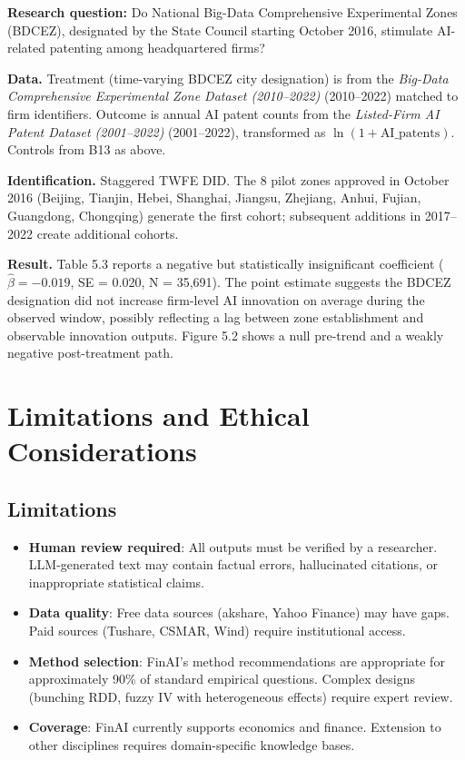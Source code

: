 \documentclass[12pt, a4paper]{article}
\begin{document}
\textbf{Research question:} Do National Big-Data Comprehensive Experimental
Zones (BDCEZ), designated by the State Council starting October 2016,
stimulate AI-related patenting among headquartered firms?

\textbf{Data.} Treatment (time-varying BDCEZ city designation) is from the
\textit{Big-Data Comprehensive Experimental Zone Dataset (2010--2022)} (2010--2022) matched to firm identifiers.
Outcome is annual AI patent counts from the \textit{Listed-Firm AI Patent Dataset (2001--2022)}
(2001--2022), transformed as $\ln(1 + \text{AI\_patents})$.  Controls
from B13 as above.

\textbf{Identification.} Staggered TWFE DID.  The 8 pilot zones approved
in October 2016 (Beijing, Tianjin, Hebei, Shanghai, Jiangsu, Zhejiang,
Anhui, Fujian, Guangdong, Chongqing) generate the first cohort; subsequent
additions in 2017--2022 create additional cohorts.

\textbf{Result.} Table 5.3 reports a negative but statistically insignificant
coefficient ($\hat{\beta} = -0.019$, SE = 0.020, N = 35,691).
The point estimate suggests the BDCEZ designation did not
increase firm-level AI innovation on average during the observed window,
possibly reflecting a lag between zone establishment and observable
innovation outputs.  Figure 5.2 shows a null pre-trend and a
weakly negative post-treatment path.%

\section{Limitations and Ethical Considerations}

\subsection{Limitations}

\begin{itemize}
    \item \textbf{Human review required}: All outputs must be verified by a researcher. LLM-generated text may contain factual errors, hallucinated citations, or inappropriate statistical claims.
    \item \textbf{Data quality}: Free data sources (akshare, Yahoo Finance) may have gaps. Paid sources (Tushare, CSMAR, Wind) require institutional access.
    \item \textbf{Method selection}: FinAI's method recommendations are appropriate for approximately 90\% of standard empirical questions. Complex designs (bunching RDD, fuzzy IV with heterogeneous effects) require expert review.
    \item \textbf{Coverage}: FinAI currently supports economics and finance. Extension to other disciplines requires domain-specific knowledge bases.
\end{itemize}
\end{document}
